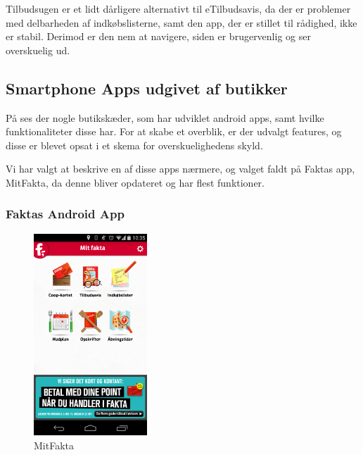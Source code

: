 Tilbudsugen er et lidt dårligere alternativt til eTilbudsavis, da der er problemer med delbarheden af indkøbslisterne, samt den app, der er stillet til rådighed, ikke er stabil.
Derimod er den nem at navigere, siden er brugervenlig og ser overskuelig ud.

\subsection{Smartphone Apps udgivet af butikker}
På  ses der nogle butikskæder, som har udviklet android apps, samt hvilke funktionaliteter disse har.
For at skabe et overblik, er der udvalgt features, og disse er blevet opsat i et skema for overskuelighedens skyld.

Vi har valgt at beskrive en af disse apps nærmere, og valget faldt på Faktas app, MitFakta, da denne bliver opdateret og har flest funktioner.
\subsubsection{Faktas Android App}

\begin{figure}
\vspace{-20pt}
	\begin{center}
		\includegraphics[width=0.38\textwidth]{images/Images/MitFakta.png}
	\end{center}
	\vspace{-20pt}
	\caption{MitFakta}
	\vspace{-20pt}
	\label{ss:MitFakta}
\end{figure}

